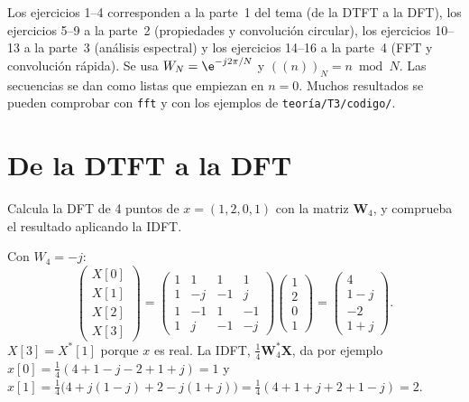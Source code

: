 \documentclass[11pt,a4paper]{scrartcl}
\begin{document}
\ifsoluciones{}\else{}\fi

Los ejercicios 1–4 corresponden a la parte~1 del tema (de la DTFT a la DFT), los ejercicios 5–9 a la parte~2 (propiedades y convolución circular), los ejercicios 10–13 a la parte~3 (análisis espectral) y los ejercicios 14–16 a la parte~4 (FFT y convolución rápida). Se usa $W_N=\e^{-j2\pi/N}$ y $((n))_N=n\bmod N$. Las secuencias se dan como listas que empiezan en $n=0$. Muchos resultados se pueden comprobar con \texttt{fft} y con los ejemplos de \texttt{teoría/T3/codigo/}.

\section*{De la DTFT a la DFT}

\begin{ejercicio}
  Calcula la DFT de 4 puntos de $x=(1,2,0,1)$ con la matriz $\mathbf W_4$, y comprueba el resultado aplicando la IDFT.
\end{ejercicio}
\begin{solucion}
  Con $W_4=-j$:
  \[
    \begin{pmatrix}X[0]\\X[1]\\X[2]\\X[3]\end{pmatrix}=
    \begin{pmatrix}1&1&1&1\\1&-j&-1&j\\1&-1&1&-1\\1&j&-1&-j\end{pmatrix}
    \begin{pmatrix}1\\2\\0\\1\end{pmatrix}=
    \begin{pmatrix}4\\1-j\\-2\\1+j\end{pmatrix}.
  \]
  $X[3]=X^*[1]$ porque $x$ es real. La IDFT, $\frac14\mathbf W_4^*\mathbf X$, da por ejemplo $x[0]=\frac14(4+1-j-2+1+j)=1$ y $x[1]=\frac14\big(4+j(1-j)+2-j(1+j)\big)=\frac14(4+1+j+2+1-j)=2$.
\end{solucion}
\end{document}
